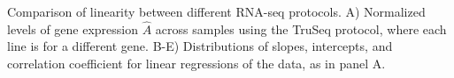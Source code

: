 Comparison of linearity between different RNA-seq protocols.  A) Normalized levels of gene expression $\hat{A}$ across samples using the TruSeq protocol, where each line is for a different gene.  B-E) Distributions of slopes, intercepts, and correlation coefficient for linear regressions of the data, as in panel A. 

\label{fig:fithists}